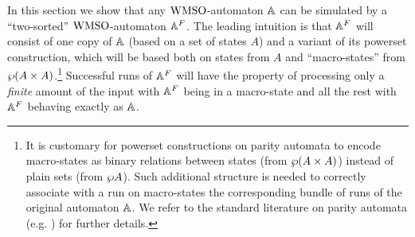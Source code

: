 
In this section we show that any $\mathrm{WMSO}$-automaton $\mathbb{A}$ can be simulated by a ``two-sorted'' $\mathrm{WMSO}$-automaton $\mathbb{A}^{F}$. The leading intuition is that $\mathbb{A}^{F}$ will consist of one copy of $\mathbb{A}$ (based on a set of states $A$) and a variant of its powerset construction, which will be based both on states from $A$ and ``macro-states'' from $\wp (A \times A)$.\footnote{It is customary for powerset constructions on parity automata to encode macro-states as binary relations between states (from $\wp (A \times A)$) instead of plain sets (from $\wp A$). Such additional structure is needed to correctly associate with a run on macro-states the corresponding bundle of runs of the original automaton $\mathbb{A}$. We refer to the standard literature on parity automata (e.g. \cite{Walukiewicz96,ALG02}) for further details.} Successful runs of $\mathbb{A}^{F}$ will have the property of processing only a \emph{finite} amount of the input with $\mathbb{A}^{F}$ being in a macro-state and all the rest with $\mathbb{A}^{F}$ behaving exactly as $\mathbb{A}$.



\begin{comment} %
For the purpose of defining $\mb{A}^{\f}$, we first need some preliminaries to shape our variant of the powerset construction. As standard in automata theory, the idea is that the powerset construct $\mb{A}^{\sharp}$ on $\mb{A}$ mimics multiple runs of $\mb{A}$ acting in parallel on the same input. Thus states of $\mb{A}^{\sharp}$ will be in fact ``macro-states'', each representing a set of states of $\mb{A}$. However, in order to define a correct notion of acceptance for $\mb{A}^{\sharp}$, one needs to keep track of the structure of each run of $\mb{A}$ that is simulated in parallel. For this reason, the macro-states of $\mb{A}^{\sharp}$ are not given as plain sets of states from $\aut$ but instead as \emph{binary relations}: the idea is that a pair $(a,b)$ in a macro state encodes the information that one of the simulated runs of $\aut$ is in state $b$ at the current stage and was at state $a$ at the previous stage. We refer to the standard literature on tree automata (e.g. \cite{Walukiewicz96,ALG02}) for further details.

Next we introduce the ingredients to define our variant of the powerset construction. The following is a notion of lifting for types on states that is instrumental in defining a translation to types on macro-states.
\end{comment}



